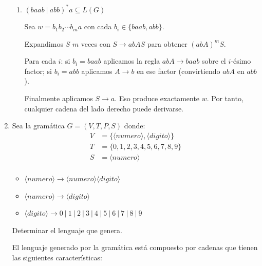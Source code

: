 \documentclass[12pt]{book} %
\begin{document}
\begin{enumerate}
\begin{solucion}[Ejercicio 2.a]
\begin{enumerate}
           \item $(baab \ | \ abb)^* a \subseteq L(G)$

               Sea $w = b_1b_2\cdots b_ma$ con cada $b_i \in \{baab, abb\}$.

               Expandimos $S$ $m$ veces con $S \to abAS$ para obtener $(abA)^mS$.

               Para cada $i$: si $b_i = baab$ aplicamos la regla $abA \to baab$ sobre el $i$-ésimo factor; si $b_i = abb$ aplicamos $A \to b$ en ese factor (convirtiendo $abA$ en $abb$).

               Finalmente aplicamos $S \to a$. Eso produce exactamente $w$. Por tanto, cualquier cadena del lado derecho puede derivarse.
       \end{enumerate}

   \end{solucion}
\item
  Sea la gramática \(G = (V, T, P, S)\) donde:\\
  \begin{align*}
   V &= \{\langle numero \rangle, \langle digito \rangle\} \\
   T &= \{0, 1, 2, 3, 4, 5, 6, 7, 8, 9\} \\
   S &= \langle numero \rangle \\
   \end{align*}

  \begin{itemize}
       \item $\langle numero \rangle \to \langle numero \rangle \langle digito \rangle$
       \item $\langle numero \rangle \to \langle digito \rangle$
       \item $\langle digito \rangle \to 0 \ | \ 1 \ | \ 2 \ | \ 3 \ | \ 4 \ | \ 5 \ | \ 6 \ | \ 7 \ | \ 8 \ | \ 9$
   \end{itemize}

  Determinar el lenguaje que genera.

  \begin{solucion}[Ejercicio 2.b]

   El lenguaje generado por la gramática está compuesto por cadenas que tienen las siguientes características:


\end{solucion}
\end{enumerate}
\end{document}
